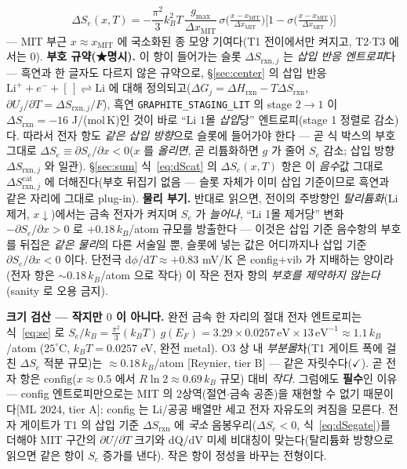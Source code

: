 \documentclass[11pt,a4paper]{article}
\newcommand{\dd}{\mathrm{d}}
\newcommand{\rxn}{\mathrm{rxn}}
\newcommand{\cat}{\mathrm{cat}}
\newcommand{\config}{\mathrm{config}}
\newcommand{\MIT}{\mathrm{MIT}}
\newcommand{\code}[1]{\texttt{#1}}
\begin{document}
\begin{equation}
\boxed{\;\Delta S_e(x,T)=-\frac{\pi^2}{3}k_B^2T\,\frac{g_{\max}}{\Delta x_\MIT}\,
\sigma\!\Big(\tfrac{x-x_\MIT}{\Delta x_\MIT}\Big)\Big[1-\sigma\!\Big(\tfrac{x-x_\MIT}{\Delta x_\MIT}\Big)\Big]\;}
\label{eq:dSegate}
\end{equation}
— MIT 부근 $x\approx x_\MIT$ 에 국소화된 종 모양 기여다(T1 전이에서만 켜지고, T2$\cdot$T3 에서는 $0$). \textbf{부호 규약(★명시).}
이 항이 들어가는 슬롯 $\Delta S_{\rxn,j}$ 는 \emph{삽입 반응 엔트로피}다 — 흑연과 한 글자도 다르지 않은 규약으로,
\S\ref{sec:center} 의 삽입 반응 $\mathrm{Li}^++e^-+[\,]\rightleftharpoons\mathrm{Li}$ 에 대해 정의되고($\Delta G_j=\Delta H_\rxn-T\Delta S_\rxn$,
$\partial U_j/\partial T=\Delta S_{\rxn,j}/F$), 흑연 \code{GRAPHITE\_STAGING\_LIT} 의 stage $2\!\to\!1$ 이 $\Delta S_\rxn=-16$
J/(mol\,K)인 것이 바로 ``Li 1몰 \emph{삽입}당'' 엔트로피(stage 1 정렬로 감소)다. 따라서 전자 항도 \emph{같은 삽입 방향}으로
슬롯에 들어가야 한다 — 곧 식 박스의 부호 그대로 $\Delta S_e\equiv\partial S_e/\partial x<0$($x$ 를 \emph{올리면}, 곧 리튬화하면
$g$ 가 줄어 $S_e$ 감소; 삽입 방향 $\Delta S_{\rxn,j}$ 와 일관). \S\ref{sec:sum} 식~\eqref{eq:dScat} 의 $\Delta S_e(x,T)$ 항은 이
\emph{음수}값 그대로 $\Delta S_{\rxn,j}^\cat$ 에 더해진다(부호 뒤집기 없음 — 슬롯 자체가 이미 삽입 기준이므로 흑연과 같은
자리에 그대로 plug-in). \textbf{물리 부기.} 반대로 읽으면, 전이의 주방향인 \emph{탈리튬화}(Li 제거, $x\downarrow$)에서는 금속
전자가 켜지며 $S_e$ 가 \emph{늘어나}, ``Li 1몰 제거당'' 변화 $-\partial S_e/\partial x>0$ 로 $+0.18\,k_B$/atom 규모를 방출한다
— 이것은 삽입 기준 음수항의 부호를 뒤집은 \emph{같은 물리}의 다른 서술일 뿐, 슬롯에 넣는 값은 어디까지나 삽입 기준
$\partial S_e/\partial x<0$ 이다. 단전극 $\dd\phi/\dd T\approx+0.83$ mV/K 은 config$+$vib 가 지배하는 양이라(전자 항은
$\sim0.18\,k_B$/atom 으로 작다) 이 작은 전자 항의 \emph{부호를 제약하지 않는다}(sanity 로 오용 금지).

\textbf{크기 검산 — 작지만 $0$ 이 아니다.} 완전 금속 한 자리의 절대 전자 엔트로피는 식~\eqref{eq:se} 로
$S_e/k_B=\frac{\pi^2}{3}(k_BT)\,g(E_F)=3.29\times0.0257\,\text{eV}\times13\,\text{eV}^{-1}\approx1.1\,k_B$/atom
($25^\circ$C, $k_BT=0.0257$ eV, 완전 metal). O3 상 내 \emph{부분몰}차(T1 게이트 폭에 걸친 $\Delta S_e$ 적분 규모)는 $\approx0.18\,k_B$/atom
[Reynier, tier B] — 같은 자릿수다($\checkmark$). 곧 전자 항은 $\config$($x\approx0.5$ 에서 $R\ln2\approx0.69\,k_B$
규모) 대비 \emph{작다}. 그럼에도 \textbf{필수}인 이유 — config 엔트로피만으로는 MIT 의 2상역(절연$\cdot$금속 공존)을 재현할
수 없기 때문이다[ML 2024, tier A]: config 는 Li/공공 배열만 세고 전자 자유도의 켜짐을 모른다. 전자 게이트가 T1 의
삽입 기준 $\Delta S_{\rxn}$ 에 \emph{국소} 음봉우리($\Delta S_e<0$, 식~\eqref{eq:dSegate})를 더해야 MIT 구간의
$\partial U/\partial T$ 크기와 dQ/dV 미세 비대칭이 맞는다(탈리튬화 방향으로 읽으면 같은 항이 $S_e$ 증가를 낸다). 작은 항이 정성을 바꾸는 전형이다.
\end{document}
